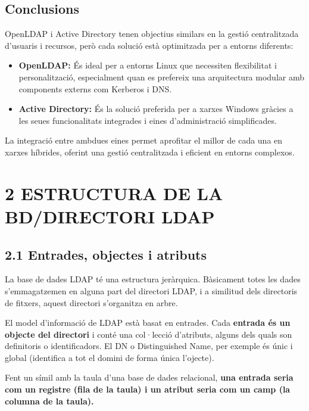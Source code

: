 \documentclass[
  12 pt,
  a4paper,
]{article}
\providecommand{\tightlist}{%
  \setlength{\itemsep}{0pt}\setlength{\parskip}{0pt}}
\begin{document}
\subsection{Conclusions}\label{conclusions}

OpenLDAP i Active Directory tenen objectius similars en la gestió
centralitzada d'usuaris i recursos, però cada solució està optimitzada
per a entorns diferents:

\begin{itemize}
\tightlist
\item
  \textbf{OpenLDAP:} És ideal per a entorns Linux que necessiten
  flexibilitat i personalització, especialment quan es prefereix una
  arquitectura modular amb components externs com Kerberos i DNS.
\item
  \textbf{Active Directory:} És la solució preferida per a xarxes
  Windows gràcies a les seues funcionalitats integrades i eines
  d'administració simplificades.
\end{itemize}

La integració entre ambdues eines permet aprofitar el millor de cada una
en xarxes híbrides, oferint una gestió centralitzada i eficient en
entorns complexos.

\section{2 ESTRUCTURA DE LA BD/DIRECTORI
LDAP}\label{estructura-de-la-bddirectori-ldap}

\subsection{2.1 Entrades, objectes i
atributs}\label{entrades-objectes-i-atributs}

La base de dades LDAP té una estructura jeràrquica. Bàsicament totes les
dades s'emmagatzemen en alguna part del directori LDAP, i a similitud
dels directoris de fitxers, aquest directori s'organitza en arbre.

El model d'informació de LDAP està basat en entrades. Cada
\textbf{entrada és un objecte del directori} i conté una col·lecció
d'atributs, alguns dels quals son definitoris o identificadors. El DN o
Distinguished Name, per exemple és únic i global (identifica a tot el
domini de forma única l'ojecte).

Fent un símil amb la taula d'una base de dades relacional, \textbf{una
entrada seria com un registre (fila de la taula) i un atribut seria com
un camp (la columna de la taula).}
\end{document}
